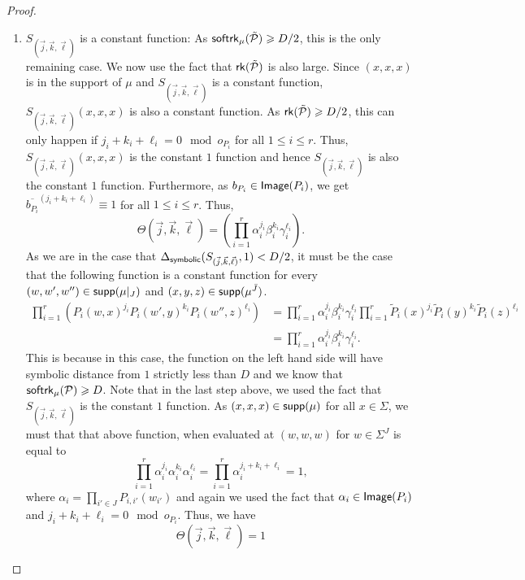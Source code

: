 \documentclass[10pt,a4paper]{amsart}
\renewcommand\geq{\geqslant}
\renewcommand\leq{\leqslant}
\begin{document}
\begin{proof}
\begin{enumerate}
        \item[(c)]  $S_{(\vec{j}, \vec{k}, \vec{\ell})}$ is a constant function: As ${\sf softrk}_{\mu}(\tilde{\mathcal{P}})\geq D/2$, this is the only remaining case. We now use the fact that ${\sf rk}(\tilde{\mathcal{P}})$ is also large. Since $(x, x, x)$ is in the support of $\mu$ and $S_{(\vec{j}, \vec{k}, \vec{\ell})}$ is a constant function, $S_{(\vec{j}, \vec{k}, \vec{\ell})}(x, x, x)$ is also a constant function. As ${\sf rk}(\tilde{\mathcal{P}})\geq D/2$, this can only happen if $j_i+k_i+\ell_i = 0 \mod o_{P_{i}}$ for all $1\leq i\leq r$. Thus, $S_{(\vec{j}, \vec{k}, \vec{\ell})}(x, x, x)$ is the constant $1$ function and hence $S_{(\vec{j}, \vec{k}, \vec{\ell})}$ is also the constant $1$ function. Furthermore, as $b_{P_i}\in {\sf Image}(P_i)$, we get $\overline{b_{P_i}}^{(j_i +k_i+\ell_i)}\equiv 1$ for all $1\leq i\leq r$. Thus, 
         $$\Theta(\vec{j}, \vec{k}, \vec{\ell}) =  \left(\prod_{i=1}^r\alpha_i^{j_i} \beta_i^{k_i} \gamma_i^{\ell_i}\right).$$
         As we are in the case that $\Delta_{{\sf symbolic}}(S_{(\vec{j}, \vec{k}, \vec{\ell})},1)< D/2$, it must be the case that the following function is a constant function for every $(w, w', w'') \in {\sf supp}(\mu|_{J})$ and $(x, y, z)\in {\sf supp}(\mu^{\bar{J}})$.
         \begin{align*}
         \prod_{i=1}^r \left( P_i(w,x)^{j_i} P_i(w',y)^{k_i} P_i(w'',z)^{\ell_i}\right) &=\prod_{i=1}^r  \alpha_i^{j_i} \beta_i^{k_i} \gamma_i^{\ell_i} \prod_{i=1}^r \tilde{P}_i(x)^{j_i} \tilde{P}_i(y)^{k_i} \tilde{P}_i(z)^{\ell_i}\\
         & = \prod_{i=1}^r  \alpha_i^{j_i} \beta_i^{k_i} \gamma_i^{\ell_i}.
         \end{align*}
         This is because in this case, the function on the left hand side will have symbolic distance from $1$ strictly less than $D$ and we know that ${\sf softrk}_{\mu}(\mathcal{P})\geq D$. Note that in the last step above, we used the fact that $S_{(\vec{j}, \vec{k}, \vec{\ell})}$ is the constant $1$ function. As $(x, x, x)\in {\sf supp}(\mu)$ for all $x\in \Sigma$, we must that that above function, when evaluated at $(w, w, w)$  for $w\in \Sigma^{J}$ is equal to 
          $$\prod_{i=1}^r  \alpha_i^{j_i} \alpha_i^{k_i} \alpha_i^{\ell_i} = \prod_{i=1}^r  \alpha_i^{{j_i}+{k_i} +{\ell_i}} = 1,$$
          where $\alpha_i = \prod_{i'\in J} P_{i,i'}(w_{i'})$ and again we used the fact that $\alpha_i\in {\sf Image}(P_i)$ and ${j_i}+{k_i} +{\ell_i} = 0 \mod o_{P_{i}}$. Thus, we have 
%
          $$\Theta(\vec{j}, \vec{k}, \vec{\ell}) = 1$$

\end{enumerate}
\end{proof}
\end{document}
